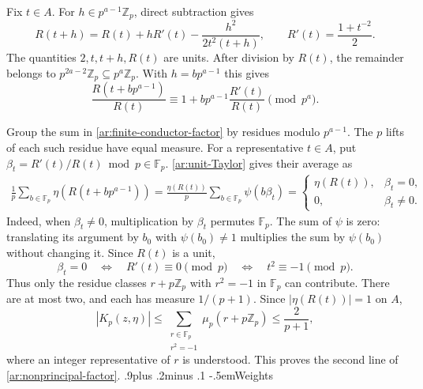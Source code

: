 \documentclass[twoside]{aomart}
\makeatletter
\theoremstyle{paperplain}
\theoremstyle{paperdefinition}
\renewcommand\subsection{\@startsection{subsection}{2}{\z@}
  {.9\baselineskip plus .2\baselineskip minus .1\baselineskip}
  {-.5em}{\normalfont\bfseries}}
\renewenvironment{proof}[1][\proofname]{\par\pushQED{\qed}%
  \normalfont\topsep6\p@\@plus3\p@\relax\trivlist
  \item[\hskip\labelsep\itshape #1\@addpunct{.}]\ignorespaces
}{\popQED\endtrivlist\@endpefalse}
\newcommand{\Z}{\mathbb Z}
\numberwithin{equation}{section}
\makeatother
\begin{document}
\begin{proof}
Fix $t\in A$. For $h\in p^{a-1}\Z_p$, direct subtraction gives
\begin{equation*}
 R(t+h)=R(t)+hR'(t)-\frac{h^2}{2t^2(t+h)},
 \qquad R'(t)=\frac{1+t^{-2}}2.
\end{equation*}
The quantities $2,t,t+h,R(t)$ are units. After division by
$R(t)$, the remainder belongs to
$p^{2a-2}\Z_p\subseteq p^a\Z_p$. With $h=bp^{a-1}$ this gives
\begin{equation}
 \frac{R(t+bp^{a-1})}{R(t)}
 \equiv1+bp^{a-1}\frac{R'(t)}{R(t)}\pmod{p^a}.
 \label{ar:unit-Taylor}
\end{equation}

Group the sum in \eqref{ar:finite-conductor-factor} by residues
modulo $p^{a-1}$. The $p$ lifts of each such residue have equal
measure. For a representative $t\in A$, put
$\beta_t=R'(t)/R(t)\bmod p\in\mathbb F_p$.
\eqref{ar:unit-Taylor} gives their average as
\begin{equation*}
 \begin{aligned}
 \frac1p\sum_{b\in\mathbb F_p}\eta(R(t+bp^{a-1}))
 =\frac{\eta(R(t))}{p}\sum_{b\in\mathbb F_p}\psi(b\beta_t)
 =\begin{cases}\eta(R(t)),&\beta_t=0,\\0,&\beta_t\ne0.
 \end{cases}
 \end{aligned}
\end{equation*}
Indeed, when $\beta_t\ne0$, multiplication by $\beta_t$
permutes $\mathbb F_p$. The sum of $\psi$ is zero: translating
its argument by $b_0$ with $\psi(b_0)\ne1$ multiplies the sum
by $\psi(b_0)$ without changing it.
Since $R(t)$ is a unit,
\begin{equation*}
 \beta_t=0\quad\Longleftrightarrow\quad
 R'(t)\equiv0\pmod p\quad\Longleftrightarrow\quad
 t^2\equiv-1\pmod p.
\end{equation*}
Thus only the residue classes $r+p\Z_p$ with $r^2=-1$ in
$\mathbb F_p$ can contribute. There are at most two, and each
has measure $1/(p+1)$. Since $|\eta(R(t))|=1$ on $A$,
\begin{equation*}
 |K_p(z,\eta)|
 \le\sum_{\substack{r\in\mathbb F_p\\r^2=-1}}
       \mu_p(r+p\Z_p)
 \le\frac2{p+1},
\end{equation*}
where an integer representative of $r$ is understood.
This proves the second line of \eqref{ar:nonprincipal-factor}.
\end{proof}
\subsection{Weights}
\end{document}

